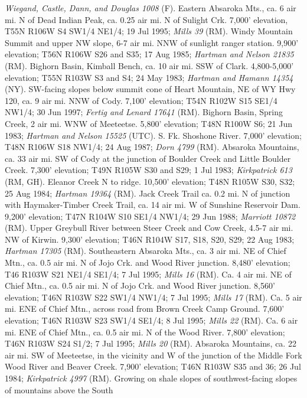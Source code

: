 \textit{Wiegand, Castle, Dann, and Douglas 1008} (F).
Eastern Absaroka Mts., ca. 6 air mi. N of Dead Indian Peak, ca. 0.25 air mi. N 
of Sulight Crk. 7,000’ elevation, T55N R106W S4 SW1/4 NE1/4; 19 Jul 1995;
\textit{Mills 39} (RM).
Windy Mountain Summit and upper NW slope, 6-7 air mi. NNW of sunlight
ranger station. 9,900’ elevation; T56N R106W S26 and S35; 17 Aug 1985;
\textit{Hartman and Nelson 21835} (RM).
Bighorn Basin, Kimball Bench, ca. 10 air mi. SSW of Clark. 4,800-5,000’
elevation; T55N R103W S3 and S4; 24 May 1983;
\textit{Hartman and Hamann 14354} (NY).
SW-facing slopes below summit cone of Heart Mountain, NE of WY Hwy 120, ca. 9
air mi. NNW of Cody. 7,100’ elevation; T54N R102W S15 SE1/4 NW1/4; 30 Jun 1997;
\textit{Fertig and Lenard 17641} (RM).
Bighorn Basin, Spring Creek, 2 air mi. WNW of Meeteetse. 5,800’ elevation;
T48N R100W S6; 21 Jun 1983; \textit{Hartman and Nelson 15525} (UTC).
S. Fk. Shoshone River. 7,000’ elevation; T48N R106W S18 NW1/4; 24 Aug 1987;
\textit{Dorn 4799} (RM).
Absaroka Mountains, ca. 33 air mi. SW of Cody at the junction of Boulder Creek
and Little Boulder Creek. 7,300’ elevation; T49N R105W S30 and S29; 1 Jul 1983;
\textit{Kirkpatrick 613} (RM, GH).
Eleanor Creek N to ridge. 10,500’ elevation; T48N R105W S30, S32; 25 Aug 1984;
\textit{Hartman 19364} (RM).
Jack Creek Trail ca. 0.2 mi. N of junction with Haymaker-Timber Creek Trail,
ca. 14 air mi. W of Sunshine Reservoir Dam.  9,200’ elevation; T47N R104W S10
SE1/4 NW1/4; 29 Jun 1988; \textit{Marriott 10872} (RM).
Upper Greybull River between Steer Creek and Cow Creek, 4.5-7 air mi. NW of
Kirwin. 9,300’ elevation; T46N R104W S17, S18, S20, S29; 22 Aug 1983;
\textit{Hartman 17305} (RM).
Southeastern Absaroka Mts., ca. 3 air mi. NE of Chief Mtn., ca. 0.5 air mi. N
of Jojo Crk. and Wood River junction. 8,480’ elevation; T46 R103W S21 NE1/4
SE1/4; 7 Jul 1995; \textit{Mills 16} (RM).
Ca. 4 air mi. NE of Chief Mtn., ca. 0.5 air mi. N of Jojo Crk. and Wood River
junction. 8,560’ elevation; T46N R103W S22 SW1/4 NW1/4; 7 Jul 1995;
\textit{Mills 17} (RM).
Ca. 5 air mi. ENE of Chief Mtn., across road from Brown Creek Camp Ground.
7,600’ elevation; T46N R103W S23 SW1/4 SE1/4; 8 Jul 1995; 
\textit{Mills 22} (RM).
Ca. 6 air mi. ENE of Chief Mtn., ca. 0.5 air mi. N of the Wood River. 7,800’
elevation; T46N R103W S24 S1/2; 7 Jul 1995; \textit{Mills 20} (RM).
Absaroka Mountains, ca. 22 air mi. SW of Meeteetse, in the vicinity and W of the
junction of the Middle Fork Wood River and Beaver Creek. 7,900’ elevation;
T46N R103W S35 and 36; 26 Jul 1984; \textit{Kirkpatrick 4997} (RM).
Growing on shale slopes of southwest-facing slopes of mountains above the South
